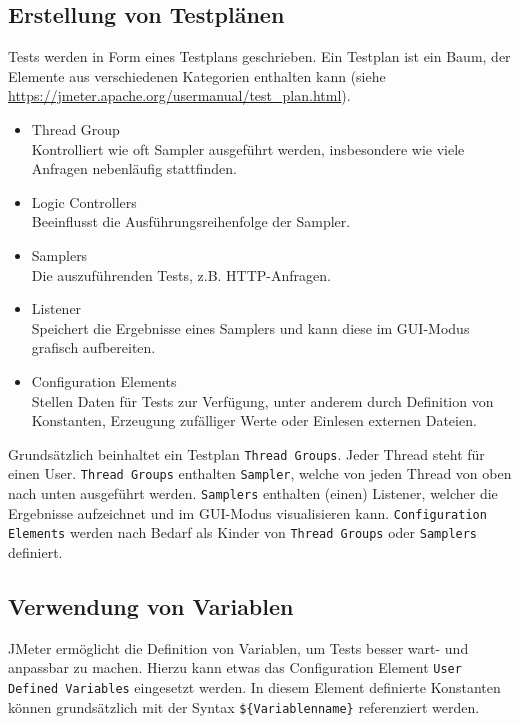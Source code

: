 \subsection{Erstellung von Testplänen}

Tests werden in Form eines Testplans geschrieben.
Ein Testplan ist ein Baum, der Elemente aus verschiedenen Kategorien enthalten kann (siehe \url{https://jmeter.apache.org/usermanual/test_plan.html}).

\begin{itemize}
    \item Thread Group\hfill
          \\Kontrolliert wie oft Sampler ausgeführt werden, insbesondere wie viele Anfragen nebenläufig stattfinden.
    \item Logic Controllers\hfill
          \\Beeinflusst die Ausführungsreihenfolge der Sampler.
    \item Samplers\hfill
          \\Die auszuführenden Tests, z.B. HTTP-Anfragen.
    \item Listener\hfill
          \\Speichert die Ergebnisse eines Samplers und kann diese im GUI-Modus grafisch aufbereiten.
    \item Configuration Elements\hfill
          \\Stellen Daten für Tests zur Verfügung, unter anderem durch Definition von Konstanten, Erzeugung zufälliger Werte oder Einlesen externen Dateien.
\end{itemize}

Grundsätzlich beinhaltet ein Testplan \texttt{Thread Groups}.
Jeder Thread steht für einen User.
\texttt{Thread Groups} enthalten \texttt{Sampler}, welche von jeden Thread von oben nach unten ausgeführt werden.
\texttt{Samplers} enthalten (einen) Listener, welcher die Ergebnisse aufzeichnet und im GUI-Modus visualisieren kann.
\texttt{Configuration Elements} werden nach Bedarf als Kinder von \texttt{Thread Groups} oder \texttt{Samplers} definiert.


\subsection{Verwendung von Variablen}

JMeter ermöglicht die Definition von Variablen, um Tests besser wart- und anpassbar zu machen.
Hierzu kann etwas das Configuration Element \texttt{User Defined Variables} eingesetzt werden.
In diesem Element definierte Konstanten können grundsätzlich mit der Syntax \texttt{\$\{Variablenname\}} referenziert werden.


